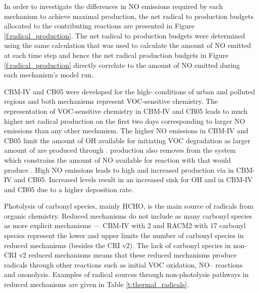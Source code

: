 In order to investigate the differences in NO emissions required by each mechanism to achieve maximal  production, the net radical to  production budgets allocated to the contributing reactions are presented in Figure \ref{f:radical_production}.
The net radical to  production budgets were determined using the same calculation that was used to calculate the amount of NO emitted at each time step and hence the net radical production budgets in Figure \ref{f:radical_production} directly correlate to the amount of NO emitted during each mechanism's model run.

CBM-IV and CB05 were developed for the high- conditions of urban and polluted regions \citep{Gery:1989, Yarwood:2005} and both mechanisms represent VOC-sensitive chemistry.
The representation of VOC-sensitive chemistry in CBM-IV and CB05 leads to much higher net radical production on the first two days corresponding to larger NO emissions than any other mechanism.
The higher NO emissions in CBM-IV and CB05 limit the amount of OH available for initiating VOC degradation as larger amount of  are produced through .
 production also removes  from the system which constrains the amount of NO available for reaction with  that would produce .
High NO emissions leads to high  and increased  production via  in CBM-IV and CB05.
Increased  levels result in an increased sink for OH and  in CBM-IV and CB05 due to a higher  deposition rate.

Photolysis of carbonyl species, mainly HCHO, is the main source of radicals from organic chemistry.
Reduced mechanisms do not include as many carbonyl species as more explicit mechanisms --- CBM-IV with 2 and RACM2 with 17 carbonyl species represent the lower and upper limits the number of carbonyl species in reduced mechanisms (besides the CRI v2).
The lack of carbonyl species in non-CRI v2 reduced mechanisms means that these reduced mechanisms produce radicals through other reactions such as initial VOC oxidation, NO-- reactions and ozonolysis.
Examples of radical sources through non-photolysis pathways in reduced mechanisms are given in Table \ref{t:thermal_radicals}.

